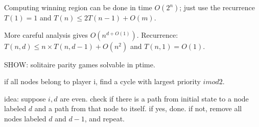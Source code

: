 \documentclass[a4paper,10pt]{article}
\newcommand{\rank}{\textrm{rank}}
\newcommand{\WR}{\textrm{WR}}
\newcommand{\att}{\textrm{Att}}
\begin{document}
 Computing winning region can be done in time $O(2^n)$; just use the recurrence $T(1) = 1$ and $T(n) \leq 2T(n-1) + O(m)$.
 
 More careful analysis gives $O(n^{d+O(1)})$. Recurrence: $T(n,d) \leq n \times T(n,d-1) + O(n^2)$ and $T(n,1) = O(1)$.

 
 SHOW: solitaire parity games solvable in ptime.
 
 if all nodes belong to player i, find a cycle with largest priority $i mod 2$.
 
 idea: suppose $i,d$ are even. check if there is a path from initial state to a node labeled $d$ and a path from that node to itself. if yes, done.
 if not, remove all nodes labeled $d$ and $d-1$, and repeat.
 
 

%  
%  
%  
% 
\end{document}

